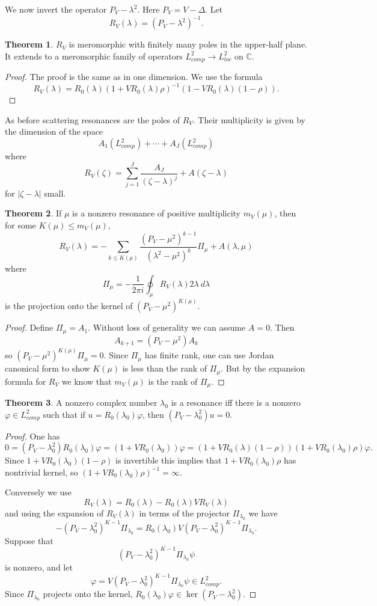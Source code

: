 \documentclass[12pt]{report}
\newcommand{\CC}{\mathbb{C}}
\theoremstyle{definition}
\newtheorem{theorem}{Theorem}[chapter]
\begin{document}
We now invert the operator $P_V - \lambda^2$. Here $P_V = V - \Delta$. Let
$$R_V(\lambda) = (P_V - \lambda^2)^{-1}.$$
\begin{theorem}
$R_V$ is meromorphic with finitely many poles in the upper-half plane. It extends to a meromorphic family of operators $L^2_{comp} \to L^2_{loc}$ on $\CC$.
\end{theorem}
\begin{proof}
The proof is the same as in one dimension. We use the formula
$$R_V(\lambda) = R_0(\lambda)(1 + VR_0(\lambda)\rho)^{-1}(1 - VR_0(\lambda)(1 - \rho)).$$
\end{proof}

As before scattering resonances are the poles of $R_V$. Their multiplicity is given by the dimension of the space
$$A_1(L^2_{comp}) + \cdots + A_J(L^2_{comp})$$
where
$$R_V(\zeta) = \sum_{j=1}^J \frac{A_J}{(\zeta - \lambda)^j} + A(\zeta - \lambda)$$
for $|\zeta - \lambda|$ small.
\begin{theorem}
If $\mu$ is a nonzero resonance of positive multiplicity $m_V(\mu)$, then for some $K(\mu) \leq m_V(\mu)$,
$$R_V(\lambda) = -\sum_{k \leq K(\mu)} \frac{(P_V - \mu^2)^{k-1}}{(\lambda^2 - \mu^2)^k} \Pi_\mu + A(\lambda, \mu)$$
where
$$\Pi_\mu = -\frac{1}{2\pi i}\oint_\mu R_V(\lambda)2\lambda~d\lambda$$
is the projection onto the kernel of $(P_V - \mu^2)^{K(\mu)}$.
\end{theorem}
\begin{proof}
Define $\Pi_\mu = A_1$. Without loss of generality we can assume $A = 0$. Then
$$A_{k+1} = (P_V - \mu^2)A_k $$
so $(P_V - \mu^2)^{K(\mu)}\Pi_\mu = 0$.
Since $\Pi_\mu$ has finite rank, one can use Jordan canonical form to show $K(\mu)$ is less than the rank of $\Pi_\mu$.
But by the expansion formula for $R_V$ we know that $m_V(\mu)$ is the rank of $\Pi_\mu$.
\end{proof}
\begin{theorem}
A nonzero complex number $\lambda_0$ is a resonance iff there is a nonzero $\varphi \in L^2_{comp}$ such that if $u = R_0(\lambda_0)\varphi$, then $(P_V - \lambda_0^2)u = 0$.
\end{theorem}
\begin{proof}
One has
$$0 = (P_V - \lambda_0^2)R_0(\lambda_0)\varphi = (1 + VR_0(\lambda_0))\varphi = (1 + VR_0(\lambda)(1 - \rho))(1 + VR_0(\lambda_0)\rho)\varphi.$$
Since $1 + VR_0(\lambda_0)(1 - \rho)$ is invertible this implies that $1 + VR_0(\lambda_0)\rho$ has nontrivial kernel, so $(1 + VR_0(\lambda_0)\rho)^{-1} = \infty$.

Conversely we use
$$R_V(\lambda) = R_0(\lambda) - R_0(\lambda)VR_V(\lambda)$$
and using the expansion of $R_V(\lambda)$ in terms of the projector $\Pi_{\lambda_0}$ we have
$$-(P_V - \lambda_0^2)^{K-1}\Pi_{\lambda_0} = R_0(\lambda_0)V(P_V - \lambda_0^2)^{K-1}\Pi_{\lambda_0}.$$
Suppose that
$$(P_V - \lambda_0^2)^{K-1}\Pi_{\lambda_0}\psi$$
is nonzero, and let
$$\varphi = V(P_V - \lambda_0^2)^{K-1}\Pi_{\lambda_0}\psi \in L^2_{comp}.$$
Since $\Pi_{\lambda_0}$ projects onto the kernel, $R_0(\lambda_0)\varphi \in \ker(P_V - \lambda_0^2)$.
\end{proof}
\end{document}
